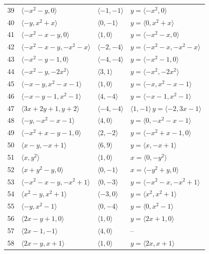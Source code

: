 \documentclass[11pt]{article}
\begin{document}
\begin{longtable}{@{}rlll@{}}
39 & $\langle -x^{2}-y,0\rangle$ & $\langle -1,-1\rangle$ & $y=\langle -x^{2},0\rangle$\\
40 & $\langle -y,x^{2}+x\rangle$ & $\langle 0,-1\rangle$ & $y=\langle 0,x^{2}+x\rangle$\\
41 & $\langle -x^{2}-x-y,0\rangle$ & $\langle 1,0\rangle$ & $y=\langle -x^{2}-x,0\rangle$\\
42 & $\langle -x^{2}-x-y,-x^{2}-x\rangle$ & $\langle -2,-4\rangle$ & $y=\langle -x^{2}-x,-x^{2}-x\rangle$\\
43 & $\langle -x^{2}-y-1,0\rangle$ & $\langle -4,-4\rangle$ & $y=\langle -x^{2}-1,0\rangle$\\
44 & $\langle -x^{2}-y,-2x^{2}\rangle$ & $\langle 3,1\rangle$ & $y=\langle -x^{2},-2x^{2}\rangle$\\
45 & $\langle -x-y,x^{2}-x-1\rangle$ & $\langle 1,0\rangle$ & $y=\langle -x,x^{2}-x-1\rangle$\\
46 & $\langle -x-y-1,x^{2}-1\rangle$ & $\langle 4,-4\rangle$ & $y=\langle -x-1,x^{2}-1\rangle$\\
47 & $\langle 3x+2y+1,y+2\rangle$ & $\langle -4,-4\rangle$ & $\langle 1,-1\rangle\,y=\langle -2,3x-1\rangle$\\
48 & $\langle -y,-x^{2}-x-1\rangle$ & $\langle 4,0\rangle$ & $y=\langle 0,-x^{2}-x-1\rangle$\\
49 & $\langle -x^{2}+x-y-1,0\rangle$ & $\langle 2,-2\rangle$ & $y=\langle -x^{2}+x-1,0\rangle$\\
50 & $\langle x-y,-x+1\rangle$ & $\langle 6,9\rangle$ & $y=\langle x,-x+1\rangle$\\
51 & $\langle x,y^{2}\rangle$ & $\langle 1,0\rangle$ & $x=\langle 0,-y^{2}\rangle$\\
52 & $\langle x+y^{2}-y,0\rangle$ & $\langle 0,-1\rangle$ & $x=\langle -y^{2}+y,0\rangle$\\
53 & $\langle -x^{2}-x-y,-x^{2}+1\rangle$ & $\langle 0,-3\rangle$ & $y=\langle -x^{2}-x,-x^{2}+1\rangle$\\
54 & $\langle x^{2}-y,x^{2}+1\rangle$ & $\langle -3,0\rangle$ & $y=\langle x^{2},x^{2}+1\rangle$\\
55 & $\langle -y,x^{2}-1\rangle$ & $\langle 0,-4\rangle$ & $y=\langle 0,x^{2}-1\rangle$\\
56 & $\langle 2x-y+1,0\rangle$ & $\langle 1,0\rangle$ & $y=\langle 2x+1,0\rangle$\\
57 & $\langle 2x-1,-1\rangle$ & $\langle 4,0\rangle$ & --\\
58 & $\langle 2x-y,x+1\rangle$ & $\langle 1,0\rangle$ & $y=\langle 2x,x+1\rangle$\\

\end{longtable}
\end{document}
